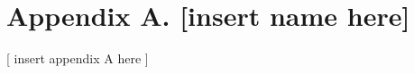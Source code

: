 \documentclass[twoside,letterpaper]{article}
\begin{document}

\section{Appendix A. [insert name here]}
[ insert appendix A here ]
\end{document}
